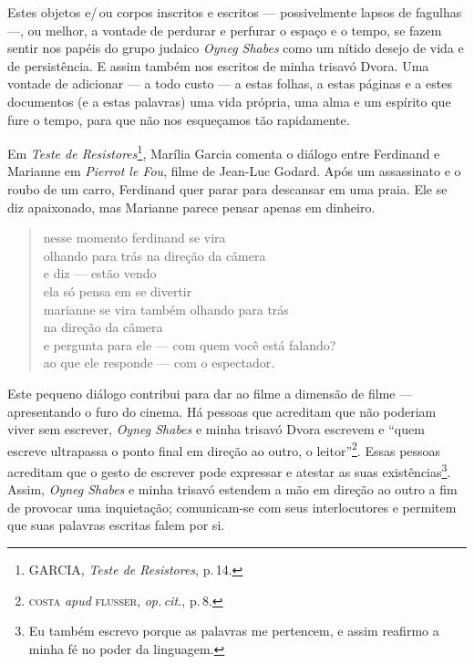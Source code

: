 
Estes objetos e/\,ou corpos inscritos e escritos --- possivelmente lapsos
de fagulhas ---, ou melhor, a vontade de perdurar e perfurar o espaço e
o tempo, se fazem sentir nos papéis do grupo judaico \emph{Oyneg Shabes}
como um nítido desejo de vida e de persistência. E assim também nos
escritos de minha trisavó Dvora. Uma vontade de adicionar --- a todo
custo --- a estas folhas, a estas páginas e a estes documentos (e a
estas palavras) uma vida própria, uma alma e um espírito que fure o
tempo, para que não nos esqueçamos tão rapidamente.

Em \emph{Teste de Resistores}\footnote{GARCIA, \emph{Teste de
  Resistores}, p.\,14.}, Marília Garcia comenta o diálogo entre Ferdinand
e Marianne em \emph{Pierrot le Fou}, filme de Jean-Luc Godard. Após um
assassinato e o roubo de um carro, Ferdinand quer parar para descansar
em uma praia. Ele se diz apaixonado, mas Marianne parece pensar apenas
em dinheiro.

\begin{verse}
nesse momento ferdinand se vira\\
olhando para trás na direção da câmera\\
e diz --- estão vendo\\
ela só pensa em se divertir\\
marianne se vira também olhando para trás\\
na direção da câmera\\
e pergunta para ele --- com quem você está falando?\\
ao que ele responde --- com o espectador.
\end{verse}

Este pequeno diálogo contribui para dar ao filme a dimensão de filme ---
apresentando o furo do cinema. Há pessoas que acreditam que não poderiam
viver sem escrever, \emph{Oyneg Shabes} e minha trisavó Dvora escrevem e
``quem escreve ultrapassa o ponto final em direção ao outro, o
leitor''\footnote{\textsc{costa} \emph{apud} \textsc{flusser}, \emph{op.\,cit.}, p.\,8.}. Essas pessoas
acreditam que o gesto de escrever pode expressar e atestar as suas
existências\footnote{Eu também escrevo porque as palavras me pertencem,
  e assim reafirmo a minha fé no poder da linguagem.}. Assim,
\emph{Oyneg Shabes} e minha trisavó estendem a mão em direção ao outro a
fim de provocar uma inquietação; comunicam-se com seus interlocutores e
permitem que suas palavras escritas falem por si.


